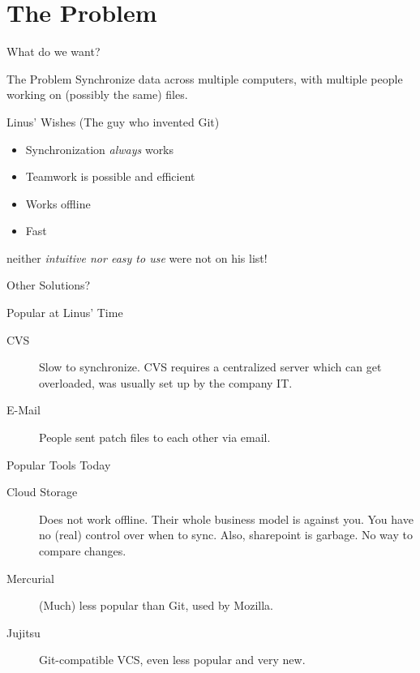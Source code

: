 \documentclass[xetex]{beamer}
\begin{document}

\section{The Problem}

\begin{frame}{What do we want?}
  \begin{alertblock}{The Problem}
    Synchronize data across multiple computers, with multiple people working on
    (possibly the same) files.
  \end{alertblock}
  \pause

  \begin{block}{Linus' Wishes (The guy who invented Git)}
    \begin{itemize}
      \item Synchronization \emph{always} works
      \item Teamwork is possible and efficient
      \item Works offline
      \item Fast
    \end{itemize}
    neither \emph{intuitive nor easy to use} were not on his list!
  \end{block}
\end{frame}

\begin{frame}{Other Solutions?}
  \begin{block}{Popular at Linus' Time}
    \begin{description}
      \item[CVS] Slow to synchronize. CVS requires a centralized server which
        can get overloaded, was usually set up by the company IT.
      \item[E-Mail] People sent patch files to each other via email.
    \end{description}
  \end{block}
  \begin{block}{Popular Tools Today}
    \begin{description}
      \item[Cloud Storage] Does not work offline. Their whole business model is
        against you. You have no (real) control over when to sync. Also,
        sharepoint is garbage. No way to compare changes.

      \item[Mercurial] (Much) less popular than Git, used by Mozilla.

      \item[Jujitsu] Git-compatible VCS, even less popular and very new.
    \end{description}
  \end{block}
\end{frame}
\end{document}
